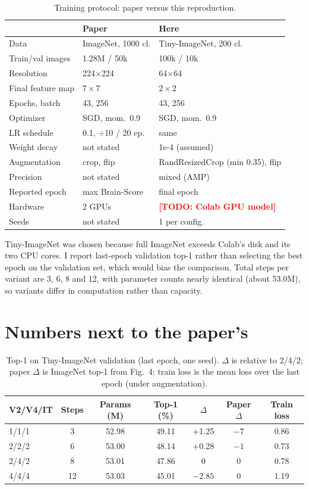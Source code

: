 \documentclass[conference]{IEEEtran}
\newcommand{\todo}[1]{\textcolor{red}{\textbf{[TODO: #1]}}}
\begin{document}
\begin{table}[t]
\caption{Training protocol: paper versus this reproduction.}
\label{tab:protocol}
\centering\small
\begin{tabular}{@{}lll@{}}
\toprule
 & Paper & Here \\
\midrule
Data & ImageNet, 1000 cl. & Tiny-ImageNet, 200 cl. \\
Train/val images & 1.28M / 50k & 100k / 10k \\
Resolution & 224$\times$224 & 64$\times$64 \\
Final feature map & $7\times7$ & $2\times2$ \\
Epochs, batch & 43, 256 & 43, 256 \\
Optimizer & SGD, mom.\ 0.9 & SGD, mom.\ 0.9 \\
LR schedule & 0.1, $\div$10 / 20 ep. & same \\
Weight decay & not stated & 1e-4 (assumed) \\
Augmentation & crop, flip & RandResizedCrop (min 0.35), flip \\
Precision & not stated & mixed (AMP) \\
Reported epoch & max Brain-Score & final epoch \\
Hardware & 2 GPUs & \todo{Colab GPU model} \\
Seeds & not stated & 1 per config. \\
\bottomrule
\end{tabular}
\end{table}

Tiny-ImageNet \cite{tinyimagenet} was chosen because full ImageNet exceeds Colab's disk and its two CPU cores. I report last-epoch validation top-1 rather than selecting the best epoch on the validation set, which would bias the comparison. Total steps per variant are 3, 6, 8 and 12, with parameter counts nearly identical (about 53.0M), so variants differ in computation rather than capacity.

\section{Numbers next to the paper's}
\begin{table}[t]
\caption{Top-1 on Tiny-ImageNet validation (last epoch, one seed). $\Delta$ is relative to 2/4/2; paper $\Delta$ is ImageNet top-1 from Fig.~4; train loss is the mean loss over the last epoch (under augmentation).}
\label{tab:results}
\centering\small
\begin{tabular}{@{}lccccc c@{}}
\toprule
V2/V4/IT & Steps & Params (M) & Top-1 (\%) & $\Delta$ & Paper $\Delta$ & Train loss \\
\midrule
1/1/1 & 3 & 52.98 & 49.11 & +1.25 & $-7$ & 0.86 \\
2/2/2 & 6 & 53.00 & 48.14 & +0.28 & $-1$ & 0.73 \\
2/4/2 & 8 & 53.01 & 47.86 & 0 & 0 & 0.78 \\
4/4/4 & 12 & 53.03 & 45.01 & $-2.85$ & 0 & 1.19 \\
\bottomrule
\end{tabular}
\end{table}
\end{document}
